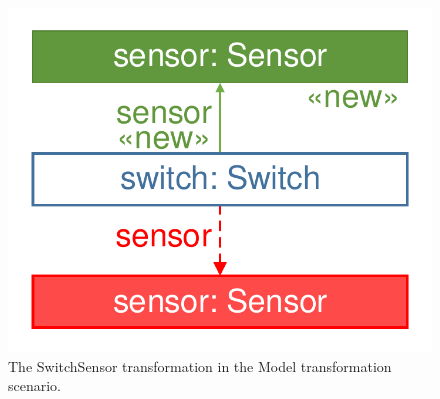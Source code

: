 \begin{figure}[htb]
	\centering
	\includegraphics[scale=0.4]{figures/trainbenchmark-transformation-xform-switchsensor}
	\caption{The \textsf{SwitchSensor} transformation in the Model transformation scenario.}
	\label{fig:trainbenchmark-transformation-xform-switchsensor}
\end{figure}


